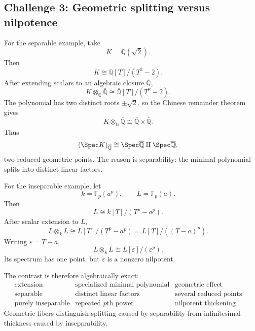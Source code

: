 \subsection*{Challenge 3: Geometric splitting versus nilpotence}
\begin{solution}
For the separable example, take
\[
K=\mathbb Q(\sqrt2).
\]
Then
\[
K\cong\mathbb Q[T]/(T^2-2).
\]
After extending scalars to an algebraic closure \(\overline{\mathbb Q}\),
\[
K\otimes_{\mathbb Q}\overline{\mathbb Q}
\cong
\overline{\mathbb Q}[T]/(T^2-2).
\]
The polynomial has two distinct roots \(\pm\sqrt2\), so the Chinese remainder theorem gives
\[
K\otimes_{\mathbb Q}\overline{\mathbb Q}
\cong
\overline{\mathbb Q}\times\overline{\mathbb Q}.
\]
Thus
\[
(\Spec K)_{\overline{\mathbb Q}}
\cong
\Spec\overline{\mathbb Q}\amalg\Spec\overline{\mathbb Q},
\]
two reduced geometric points.  The reason is separability: the minimal polynomial splits into distinct linear factors.

For the inseparable example, let
\[
k=\mathbb F_p(a^p),\qquad L=\mathbb F_p(a).
\]
Then
\[
L\cong k[T]/(T^p-a^p).
\]
After scalar extension to \(L\),
\[
L\otimes_kL
\cong
L[T]/(T^p-a^p)
=
L[T]/((T-a)^p).
\]
Writing \(\varepsilon=T-a\),
\[
L\otimes_kL\cong L[\varepsilon]/(\varepsilon^p).
\]
Its spectrum has one point, but \(\varepsilon\) is a nonzero nilpotent.

The contrast is therefore algebraically exact:
\[
\begin{array}{c|c|c}
\text{extension} & \text{specialized minimal polynomial} & \text{geometric effect}\\ \hline
\text{separable} & \text{distinct linear factors} & \text{several reduced points}\\
\text{purely inseparable} & \text{repeated }p\text{th power} & \text{nilpotent thickening}
\end{array}
\]
Geometric fibers distinguish splitting caused by separability from infinitesimal thickness caused by inseparability.
\end{solution}

